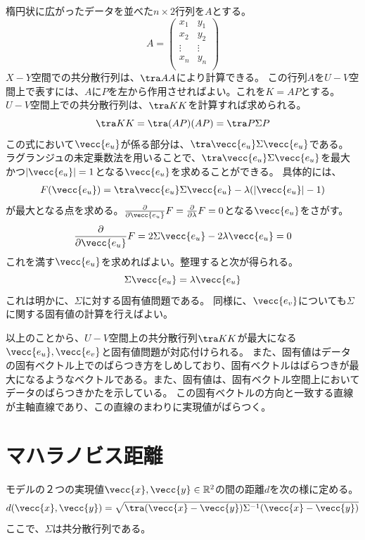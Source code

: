 楕円状に広がったデータを並べた$n\times 2$行列を$A$とする。
\begin{equation*}
 A =\begin{pmatrix}
     x_1 & y_1 \\
     x_2 & y_2 \\
     \vdots & \vdots \\
     x_n & y_n \\
 \end{pmatrix}
\end{equation*}
$X-Y$空間での共分散行列は、$\tra A A$により計算できる。
この行列$A$を$U-V$空間上で表すには、$A$に$P$を左から作用させればよい。これを$K=AP$とする。
$U-V$空間上での共分散行列は、$\tra KK$を計算すれば求められる。
\begin{equation*}
 \tra KK = \tra (AP)(AP) = \tra P\Sigma P
\end{equation*}
この式において$\vecc{e_u}$が係る部分は、$\tra\vecc{e_u} \Sigma \vecc{e_u}$である。
ラグランジュの未定乗数法を用いることで、$\tra\vecc{e_u} \Sigma \vecc{e_u}$を最大かつ$|\vecc{e_u}|=1$となる$\vecc{e_u}$を求めることができる。
具体的には、
\begin{eqnarray*}
 F(\vecc{e_u}) = \tra\vecc{e_u} \Sigma \vecc{e_u}-\lambda(|\vecc{e_u}|-1)
\end{eqnarray*}
が最大となる点を求める。$\frac{\partial}{\partial \vecc{e_u}}F = \frac{\partial }{\partial \lambda}F = 0$となる$\vecc{e_u}$をさがす。
\begin{eqnarray*}
 \frac{\partial}{\partial \vecc{e_u}}F = 2\Sigma \vecc{e_u}-2\lambda \vecc{e_u} = 0
\end{eqnarray*}
これを満す$\vecc{e_u}$を求めればよい。整理すると次が得られる。
\begin{equation*}
 \Sigma \vecc{e_u} = \lambda \vecc{e_u}
\end{equation*}
これは明かに、$\Sigma$に対する固有値問題である。
同様に、$\vecc{e_v}$についても$\Sigma$に関する固有値の計算を行えばよい。


以上のことから、$U-V$空間上の共分散行列$\tra KK$が最大になる$\vecc{e_u},\vecc{e_v}$と固有値問題が対応付けられる。
また、固有値はデータの固有ベクトル上でのばらつき方をしめしており、固有ベクトルはばらつきが最大になるようなベクトルである。また、固有値は、固有ベクトル空間上においてデータのばらつきかたを示している。
この固有ベクトルの方向と一致する直線が主軸直線であり、この直線のまわりに実現値がばらつく。

\section{マハラノビス距離}
モデルの２つの実現値$\vecc{x},\vecc{y}\in \mathbb{R}^2$の間の距離$d$を次の様に定める。
\begin{equation*}
 d(\vecc{x},\vecc{y}) = \sqrt{\tra(\vecc{x}-\vecc{y})\Sigma^{-1} (\vecc{x}-\vecc{y})}
\end{equation*}
ここで、$\Sigma$は共分散行列である。

